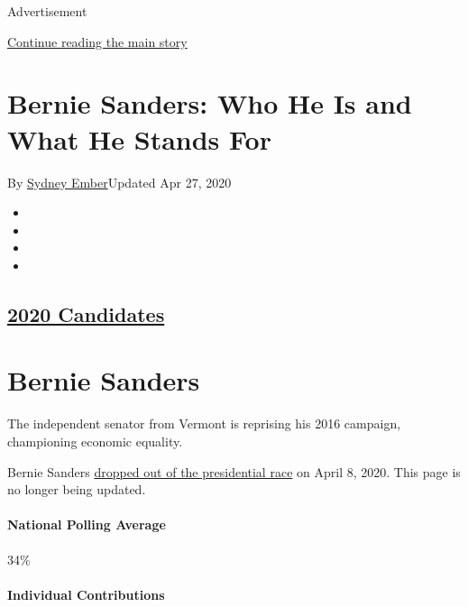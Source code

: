 Advertisement

\protect\hyperlink{after-top}{Continue reading the main story}

\hypertarget{bernie-sanders-who-he-is-and-what-he-stands-for}{%
\section{Bernie Sanders: Who He Is and What He Stands
For}\label{bernie-sanders-who-he-is-and-what-he-stands-for}}

By \href{https://www.nytimes.com/by/sydney-ember}{Sydney Ember}Updated
Apr 27, 2020

\begin{itemize}
\item
\item
\item
\item
\end{itemize}

\hypertarget{2020-candidates-}{%
\subsection{\texorpdfstring{\href{https://www.nytimes.com/interactive/2019/us/politics/2020-presidential-candidates.html}{2020
Candidates} }{2020 Candidates }}\label{2020-candidates-}}

\hypertarget{bernie-sanders}{%
\section{Bernie Sanders}\label{bernie-sanders}}

The independent senator from Vermont is reprising his 2016 campaign,
championing economic equality.

Bernie Sanders
\href{https://www.nytimes.com/2020/04/08/us/politics/bernie-sanders-drops-out.html}{dropped
out of the presidential race} on April 8, 2020. This page is no longer
being updated.

\hypertarget{national-polling-average}{%
\paragraph{National Polling Average}\label{national-polling-average}}

34\%

\hypertarget{individual-contributions}{%
\paragraph{Individual Contributions}\label{individual-contributions}}

